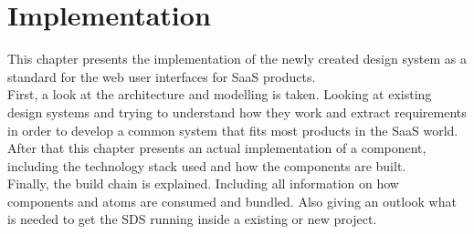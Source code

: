 \newpage
\section{Implementation}
This chapter presents the implementation of the newly created design system as a standard for the web user interfaces for SaaS products. \\
First, a look at the architecture and modelling is taken. Looking at existing design systems and trying to understand  how they work and extract requirements in order to develop a common system that fits most products in the SaaS world. \\
After that this chapter presents an actual implementation of a component, including the technology stack used and how the components are built. \\
Finally, the build chain is explained. Including all information on how components and atoms are consumed and bundled. Also giving an outlook what is needed to get the SDS running inside a existing or new project.


